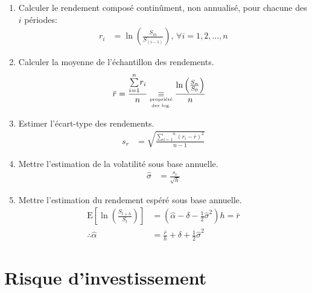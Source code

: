\documentclass[10pt, french]{article}
\begin{document}
\begin{multicols*}{2}
\begin{definitionNOHFILL}
\begin{enumerate}
	\item	Calculer le rendement composé continûment, non annualisé, pour chacune des $i$ périodes:
		\begin{align*}
		r_{i}
		&=	\ln\left(\frac{S_{ih}}{S_{(i - 1)}}\right), \, \forall i = 1, 2, \dots, n
		\end{align*}
	\item	Calculer la moyenne de l'échantillon des rendements.
		\begin{align*}
		\bar{r}
		&=	\frac{\overset{n}{\underset{i = 1}{\sum}} r_{i}}{n}	
		\underset{\tiny{\shortstack{propriété\\ des log.}}}{\equiv}	\frac{\ln\left(\frac{S_{n}}{S_{0}}\right)}{n}
		\end{align*}
	\item	Estimer l'écart-type des rendements.
		\begin{align*}
		s_{r}
		&=	\sqrt{\frac{\overset{n}{\underset{i = 1}{\sum}} (r_{i} - \bar{r})^{2}}{n - 1}}
		\end{align*}
	\item	Mettre l'estimation de la volatilité sous base annuelle.
		\begin{align*}
		\hat{\sigma}
		&=	\frac{s_{r}}{\sqrt{h}}
		\end{align*}
	\item	Mettre l'estimation du rendement espéré sous base annuelle.
		\begin{align*}
		\text{E}\left[\ln\left(\frac{S_{t + h}}{S_{t}}\right)\right]
		&=
		\left(\hat{\alpha} - \delta - \frac{1}{2} \hat{\sigma}^{2}\right)h	
		=	\bar{r}	\\
		\therefore \hat{\alpha}	&=	\frac{\bar{r}}{h} + \delta + \frac{1}{2} \hat{\sigma}^{2}
		\end{align*}
\end{enumerate}
\end{definitionNOHFILL}


\pagebreak
\section*{Risque d'investissement}

\end{multicols*}
\end{document}
